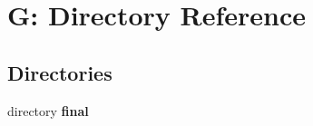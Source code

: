 \section{G\-: Directory Reference}
\label{dir_934f46a345653ef2b3014a1b37a162c1}
\subsection*{Directories}
\begin{DoxyCompactItemize}
\item 
directory {\bf final}
\end{DoxyCompactItemize}
